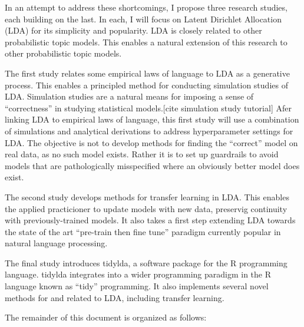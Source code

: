 \documentclass[conference,final,]{IEEEtran}
\begin{document}
In an attempt to address these shortcomings, I propose three research
studies, each building on the last. In each, I will focus on Latent
Dirichlet Allocation (LDA) for its simplicity and popularity. LDA is
closely related to other probabilistic topic models. This enables a
natural extension of this research to other probabilistic topic models.

The first study relates some empirical laws of language to LDA as a
generative process. This enables a principled method for conducting
simulation studies of LDA. Simulation studies are a natural means for
imposing a sense of ``correctness'' in studying statistical
models.{[}cite simulation study tutorial{]} Afer linking LDA to
empirical laws of language, this first study will use a combination of
simulations and analytical derivations to address hyperparameter
settings for LDA. The objective is not to develop methods for finding
the ``correct'' model on real data, as no such model exists. Rather it
is to set up guardrails to avoid models that are pathologically
misspecified where an obviously better model does exist.

The second study develops methods for transfer learning in LDA. This
enables the applied practicioner to update models with new data,
preservig continuity with previously-trained models. It also takes a
first step extending LDA towards the state of the art ``pre-train then
fine tune'' paradigm currently popular in natural language processing.

The final study introduces tidylda, a software package for the R
programming language. tidylda integrates into a wider programming
paradigm in the R language known as ``tidy'' programming. It also
implements several novel methods for and related to LDA, including
transfer learning.

The remainder of this document is organized as follows:
\end{document}
